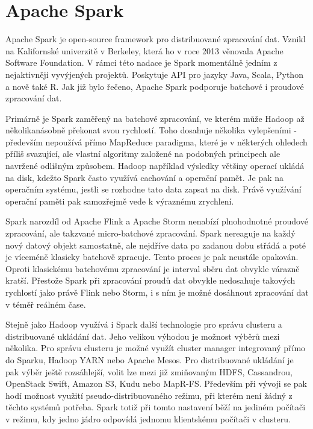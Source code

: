 \documentclass[thesis=B,czech]{FITthesis}[2012/06/26]
\begin{document}
	
\section{Apache Spark}
	Apache Spark je open-source framework pro distribuované zpracování dat. Vznikl na Kalifornské univerzitě v Berkeley, která ho v roce 2013 věnovala Apache Software Foundation. V rámci této nadace je Spark momentálně jedním z nejaktivněji vyvýjených projektů\cite{spark-toplevel}. Poskytuje API pro jazyky Java, Scala, Python a nově také R. Jak již bylo řečeno, Apache Spark podporuje batchové i proudové zpracování dat. 
	
	Primárně je Spark zaměřený na batchové zpracování, ve kterém může Hadoop až několikanásobně překonat svou rychlostí. Toho dosahuje několika vylepšeními - především nepoužívá přímo MapReduce paradigma, které je v některých ohledech příliš svazující, ale vlastní algoritmy založené na podobných principech ale navržené odlišným způsobem. Hadoop například výsledky většiny operací ukládá na disk, kdežto Spark často využívá cachování a operační pamět. Je pak na operačním systému, jestli se rozhodne tato data zapsat na disk\cite{spark-mapreduce-difference}. Právě využívání operační paměti pak samozřejmě vede k výraznému zrychlení. 
		
	Spark narozdíl od Apache Flink a Apache Storm nenabízí plnohodnotné proudové zpracování, ale takzvané micro-batchové zpracování. Spark nereaguje na každý nový datový objekt samostatně, ale nejdříve data po zadanou dobu střádá a poté je víceméně klasicky batchově zpracuje. Tento proces je pak neustále opakován. Oproti klasickému batchovému zpracování je interval sběru dat obvykle várazně kratší.  Přestože Spark při zpracování proudů dat obvykle nedosahuje takových rychlostí jako právě Flink nebo Storm, i s ním je možné dosáhnout zpracování dat v téměř reálném čase\cite{streaming-benchmark}. 

	Stejně jako Hadoop využívá i Spark další technologie pro správu clusteru a distribuované ukládání dat. Jeho velikou výhodou je možnost výběrů mezi několika. Pro správu clusteru je možné využít cluster manager integrovaný přímo do Sparku, Hadoop YARN nebo Apache Mesos. Pro distribuované ukládání je pak výběr ještě rozsáhlejší, volit lze mezi již zmiňovaným HDFS, Cassandrou, OpenStack Swift, Amazon S3, Kudu nebo MapR-FS. Především při vývoji se pak hodí možnost využití pseudo-distribuovaného režimu, při kterém není žádný z těchto systémů potřeba. Spark totiž při tomto nastavení běží na jediném počítači v režimu, kdy jedno jádro odpovídá jednomu klientskému počítači v clusteru. 
\end{document}
